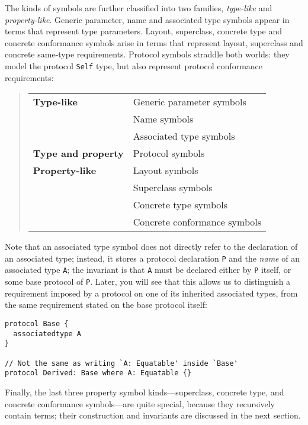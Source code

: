 \documentclass[../generics]{subfiles}
\begin{document}
%
%
The kinds of symbols are further classified into two families, \emph{type-like} and \emph{property-like}. Generic parameter, name and associated type symbols appear in terms that represent type parameters. Layout, superclass, concrete type and concrete conformance symbols arise in terms that represent layout, superclass and concrete same-type requirements. Protocol symbols straddle both worlds: they model the protocol \texttt{Self} type, but also represent protocol conformance requirements:
\begin{quote}
\begin{tabular}{|l|l|}
\hline
\textbf{Type-like}&Generic parameter symbols\\
&Name symbols\\
&Associated type symbols\\
\hline
\textbf{Type and property}& Protocol symbols\\
\hline
\textbf{Property-like}&Layout symbols\\
&Superclass symbols\\
&Concrete type symbols\\
&Concrete conformance symbols\\
\hline
\end{tabular}
\end{quote}
%
%
%
%
Note that an associated type symbol does not directly refer to the declaration of an associated type; instead, it stores a protocol declaration \texttt{P} and the \emph{name} of an associated type \texttt{A}; the invariant is that \texttt{A} must be declared either by \texttt{P} itself, or some base protocol of \texttt{P}. Later, you will see that this allows us to distinguish a requirement imposed by a protocol on one of its inherited associated types, from the same requirement stated on the base protocol itself:
\begin{Verbatim}
protocol Base {
  associatedtype A
}

// Not the same as writing `A: Equatable' inside `Base'
protocol Derived: Base where A: Equatable {}
\end{Verbatim}
Finally, the last three property symbol kinds---superclass, concrete type, and concrete conformance symbols---are quite special, because they recursively contain terms; their construction and invariants are discussed in the next section.
\end{document}
